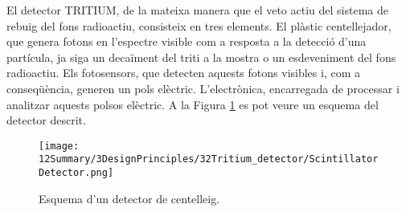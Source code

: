 El detector TRITIUM, de la mateixa manera que el veto actiu del sistema de rebuig del fons radioactiu, consisteix en tres elements. El plàstic centellejador, que genera fotons en l'espectre visible com a resposta a la detecció d'una partícula, ja siga un decaïment del triti a la mostra o un esdeveniment del fons radioactiu. Els fotosensors, que detecten aquests fotons visibles i, com a conseqüència, generen un pols elèctric. L'electrònica, encarregada de processar i analitzar aquests polsos elèctric. A la Figura \ref{fig:EsquemaDetector} es pot veure un esquema del detector descrit.

\begin{figure}[hbtp]
\texttt{[image: 12Summary/3DesignPrinciples/32Tritium\_detector/ScintillatorDetector.png]}
\centering
\caption{Esquema d'un detector de centelleig.\label{fig:EsquemaDetector}}
\end{figure}